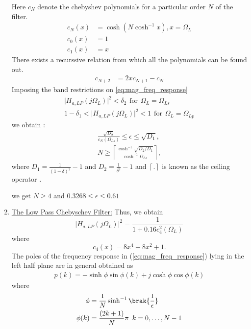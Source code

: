 \documentclass[journal,12pt,twocolumn]{IEEEtran}
\theoremstyle{remark}
\begin{document}
\begin{enumerate}
Here $c_N$ denote the chebyshev polynomials for a particular order $N$ of the filter.
\begin{align}
    c_N(x) &= \cosh(N \cosh^{-1}x) , x=\Omega_{L}\\
    c_0(x) &= 1 \\
    c_1(x) &= x
\end{align}
There exists a recurssive relation from which all the polynomials can be found out.
\begin{align}
    c_{N+2} &= 2xc_{N+1} - c_{N}  \label{eq:cheby_poly_relation}
\end{align}
Imposing the band restrictions on \eqref{eq:mag_freq_response} \\
\begin{align}
    \vert H_{a,LP}(j\Omega_L)\vert^2 < \delta_{2} \hspace{5pt} \text{for}\hspace{5pt} \Omega_L = \Omega_{Ls}\\
    1-\delta_{1}<\vert H_{a,LP}(j\Omega_L)\vert^2 < 1 \hspace{5pt} \text{for}\hspace{5pt} \Omega_L = \Omega_{Lp}
\end{align}
we obtain :
\begin{eqnarray}
\label{lpdesign}
\frac{\sqrt{D_2}}{c_N(\Omega_{Ls})} \leq \epsilon \leq \sqrt{D_1}, \nonumber \\
N \geq \left\lceil \frac{\cosh^{-1}\sqrt{D_2/D_1}}{\cosh^{-1}\Omega_{Ls}} \right\rceil,
\end{eqnarray}
where $D_1 = \frac{1}{(1 - \delta)^2}-1$ and $D_2 = \frac{1}{\delta^2} - 1$ and $\left \lceil . \right \rceil$ is known as the ceiling operator . 

we get $N\geq 4$ and $0.3268 \leq \epsilon \leq 0.61$\\
\item \underline{The Low Pass Chebyschev Filter:}  Thus, we obtain
\begin{equation}
\label{lpsqfinal}
\vert H_{a,LP}(j\Omega_L)\vert^2 = \frac{1}{1 + 0.16c_4^2(\Omega_L)}
\end{equation}
where
\begin{equation}
c_4(x) = 8x^4 - 8x^2 + 1.	
\end{equation}
The poles of the frequency response in (\ref{eq:mag_freq_response}) lying in the left half plane are in general obtained as 
\begin{align}
    p(k) = -\sinh{\phi}\sin{\phi(k)}+j\cosh{\phi}\cos{\phi(k)}
\end{align}
where
\begin{align}
    \phi &= \frac{1}{N}\sinh^{-1}{\brak{\frac{1}{\epsilon}}} \\
    \phi(k) &= \frac{(2k+1)}{N}\pi \hspace{5pt} k = 0, \dots, N-1
\end{align}


\end{enumerate}
\end{document}
